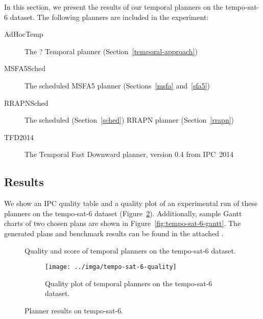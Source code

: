 In this section, we present the results of our temporal planners on the tempo-sat-6 dataset. The following planners are included in the experiment:
\begin{description}
\item[AdHocTemp] The ? Temporal planner (Section~\ref{temporal-approach})
\item[MSFA5Sched] The scheduled MSFA5 planner (Sections~\ref{msfa} and~\ref{sfa5})
\item[RRAPNSched] The scheduled (Section~\ref{sched}) RRAPN planner (Section~\ref{rrapn})
\item[TFD2014] The Temporal Fast Downward planner, version 0.4 from IPC~2014 \citep[Preferring Preferred Operators in Temporal Fast Downward]{Vallati2015}
\end{description}

\subsection{Results}\label{temporal-results}

We show an IPC quality table and a quality plot of an experimental run of these planners on the tempo-sat-6 dataset (Figure~\ref{fig:tempo-sat-6-results}).
Additionally, sample Gantt charts \citep{Gantt1910} of two chosen plans are shown in Figure~\ref{fig:tempo-sat-6-gantt}.
The generated plans and benchmark results can be found in the attached .

\begin{figure}[tbp]
\centering
\begin{subtable}{\textwidth}
\centering
\scriptsize
\renewcommand{\footnotesize}{\scriptsize}

\caption{Quality and score of temporal planners on the tempo-sat-6 dataset.}
\label{tab:tempo-sat-6-ipc-scores}
\end{subtable}

\vspace{0.5cm}
\begin{subfigure}{\textwidth}
\centering
\texttt{[image: ../imga/tempo-sat-6-quality]}
\caption{Quality plot of temporal planners on the tempo-sat-6 dataset.}
\label{fig:tempo-sat-6-quality}
\end{subfigure}
\caption{Planner results on tempo-sat-6.}
\label{fig:tempo-sat-6-results}
\end{figure}

